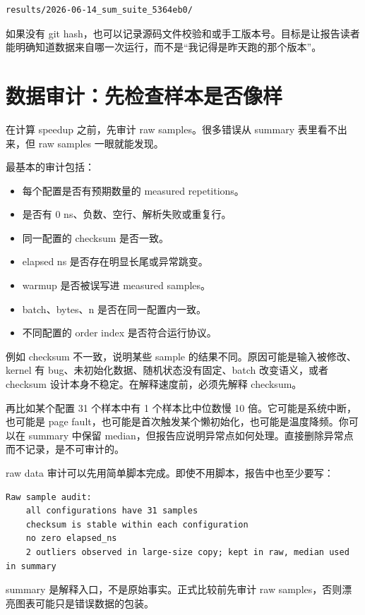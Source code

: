 \begin{lstlisting}
results/2026-06-14_sum_suite_5364eb0/
\end{lstlisting}

如果没有 git hash，也可以记录源码文件校验和或手工版本号。目标是让报告读者能明确知道数据来自哪一次运行，而不是“我记得是昨天跑的那个版本”。

\section{数据审计：先检查样本是否像样}

在计算 speedup 之前，先审计 raw samples。很多错误从 summary 表里看不出来，但 raw samples 一眼就能发现。

最基本的审计包括：

\begin{itemize}
  \item 每个配置是否有预期数量的 measured repetitions。
  \item 是否有 0 ns、负数、空行、解析失败或重复行。
  \item 同一配置的 checksum 是否一致。
  \item elapsed ns 是否存在明显长尾或异常跳变。
  \item warmup 是否被误写进 measured samples。
  \item batch、bytes、n 是否在同一配置内一致。
  \item 不同配置的 order index 是否符合运行协议。
\end{itemize}

例如 checksum 不一致，说明某些 sample 的结果不同。原因可能是输入被修改、kernel 有 bug、未初始化数据、随机状态没有固定、batch 改变语义，或者 checksum 设计本身不稳定。在解释速度前，必须先解释 checksum。

再比如某个配置 31 个样本中有 1 个样本比中位数慢 10 倍。它可能是系统中断，也可能是 page fault，也可能是首次触发某个懒初始化，也可能是温度降频。你可以在 summary 中保留 median，但报告应说明异常点如何处理。直接删除异常点而不记录，是不可审计的。

raw data 审计可以先用简单脚本完成。即使不用脚本，报告中也至少要写：

\begin{lstlisting}
Raw sample audit:
    all configurations have 31 samples
    checksum is stable within each configuration
    no zero elapsed_ns
    2 outliers observed in large-size copy; kept in raw, median used in summary
\end{lstlisting}

\begin{keyidea}
summary 是解释入口，不是原始事实。正式比较前先审计 raw samples，否则漂亮图表可能只是错误数据的包装。
\end{keyidea}

